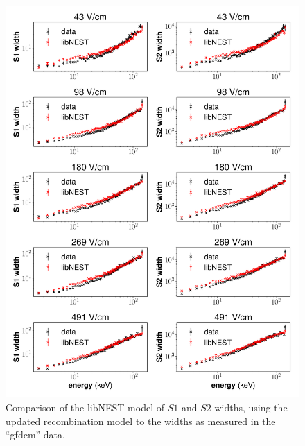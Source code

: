 \begin{figure}[h!]
\centering
  \includegraphics[width=\textwidth]{Figures/sigR_fieldvar_gfdcm.pdf}
\caption{Comparison of the libNEST model of $S1$ and $S2$ widths, using the updated recombination model to the widths as measured in the ``gfdcm'' data. }
\label{fig:sigR_fieldvar_gfdcm}
\end{figure}
